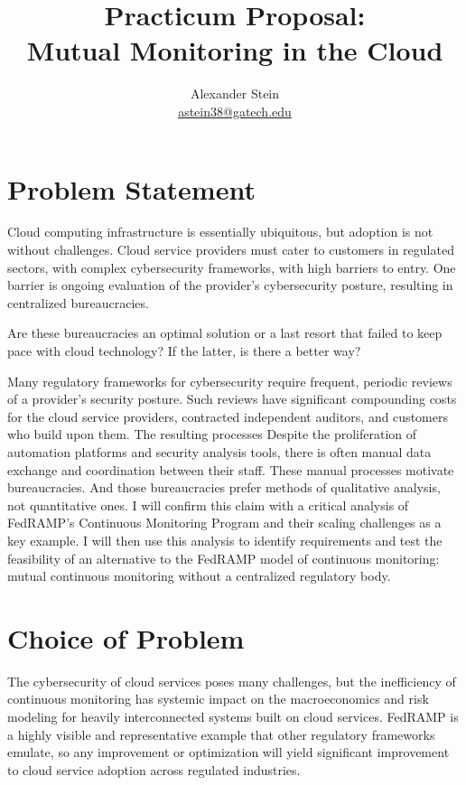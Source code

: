 \documentclass{jdf}
\begin{document}
\title{Practicum Proposal: \\ Mutual Monitoring in the Cloud}
\author{Alexander Stein \\ \href{mailto:astein38@gatech.edu}{astein38@gatech.edu}}

\maketitle
\thispagestyle{fancy}

\section{Problem Statement}

Cloud computing infrastructure is essentially ubiquitous, but adoption is not without challenges. Cloud service providers must cater to customers in regulated sectors, with complex cybersecurity frameworks, with high barriers to entry. One barrier is ongoing evaluation of the provider's cybersecurity posture, resulting in centralized bureaucracies.

Are these bureaucracies an optimal solution or a last resort that failed to keep pace with cloud technology? If the latter, is there a better way?

Many regulatory frameworks for cybersecurity require frequent, periodic reviews of a provider's security posture. Such reviews have significant compounding costs for the cloud service providers, contracted independent auditors, and customers who build upon them. The resulting processes Despite the proliferation of automation platforms and security analysis tools, there is often manual data exchange and coordination between their staff. These manual processes motivate bureaucracies. And those bureaucracies prefer methods of qualitative analysis, not quantitative ones. I will confirm this claim with a critical analysis of FedRAMP's Continuous Monitoring Program \citeyear[p.~14]{fedramp_auth_playbook25} and their scaling challenges as a key example. I will then use this analysis to identify requirements and test the feasibility of an alternative to the FedRAMP model of continuous monitoring: mutual continuous monitoring without a centralized regulatory body.

\section{Choice of Problem}

The cybersecurity of cloud services poses many challenges, but the inefficiency of continuous monitoring has systemic impact on the macroeconomics and risk modeling for heavily interconnected systems built on cloud services. FedRAMP is a highly visible and representative example that other regulatory frameworks emulate, so any improvement or optimization will yield significant improvement to cloud service adoption across regulated industries.
\end{document}
